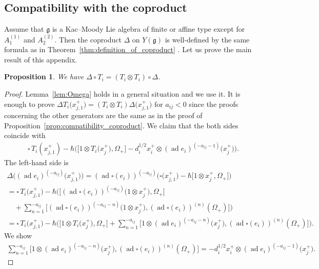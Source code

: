 \documentclass[10pt,a4paper]{amsart}
\newtheorem{prop}[thm]{Proposition}
\theoremstyle{definition}
\numberwithin{equation}{section}
\DeclareMathOperator{\ad}{ad}
\newcommand{\frakg}{\mathfrak{g}}
\begin{document}
\subsection{Compatibility with the coproduct}

Assume that $\frakg$ is a Kac--Moody Lie algebra of finite or affine type except for $A_1^{(1)}$ and $A_2^{(2)}$. Then the coproduct $\Delta$ on $Y(\frakg)$ is well-defined by the same formula as in Theorem~\ref{thm:definition_of_coproduct} \cite[Definition~4.6, Theorem~4.9, Proposition~5.18]{MR3861718}. Let us prove the main result of this appendix.
\begin{prop}\label{prop:compatibility_coproduct2} We have $\Delta \circ T_i = (T_i \otimes T_i) \circ \Delta$.
\end{prop}
\begin{proof}Lemma~\ref{lem:Omega} holds in a general situation and we use it. It is enough to prove $\Delta T_i\big(x_{j,1}^+\big) = (T_i \otimes T_i)\Delta\big(x_{j,1}^+\big)$ for $a_{ij} < 0$ since the proofs concerning the other generators are the same as in the proof of Proposition~\ref{prop:compatibility_coproduct}. We claim that the both sides coincide with
\begin{gather*}
\square\,T_i(x_{j,1}^+)-\hbar \big( \big[1 \otimes T_i\big(x_j^+\big),\Omega_+\big] - d_i^{1/2}x_i^+ \otimes (\ad e_i)^{(-a_{ij}-1)}\big(x_j^+\big) \big).
\end{gather*}
The left-hand side is
\begin{gather*}
\Delta \big( (\ad e_i)^{(-a_{ij})} \big(x_{j,1}^+\big)\big) = (\ad \square(e_i))^{(-a_{ij})} \big(\square\big(x_{j,1}^+\big) - \hbar\big[1 \otimes x_j^+,\Omega_+\big]\big) \\
= \square\,T_i\big(x_{j,1}^+\big) - \hbar\bigg( \big[(\ad \square(e_i))^{(-a_{ij})}\big(1 \otimes x_j^+\big),\Omega_+\big] \\
\quad{} + \sum_{n=1}^{-a_{ij}} \big[(\ad \square(e_i))^{(-a_{ij}-n)}\big(1 \otimes x_j^+\big),(\ad \square(e_i))^{(n)}(\Omega_+)\big]\bigg) \\
= \square\,T_i\big(x_{j,1}^+\big) - \hbar\bigg( \big[1 \otimes T_i\big(x_j^+\big),\Omega_+\big] + \sum_{n=1}^{-a_{ij}} \big[1 \otimes (\ad e_i)^{(-a_{ij}-n)}\big(x_j^+\big),(\ad \square(e_i))^{(n)}(\Omega_+)\big]\bigg).
\end{gather*}
We show
\begin{gather*}
\sum_{n=1}^{-a_{ij}} \big[1 \otimes (\ad e_i)^{(-a_{ij}-n)}\big(x_j^+\big),(\ad \square(e_i))^{(n)}(\Omega_+)\big] = - d_i^{1/2} x_i^+ \otimes (\ad e_i)^{(-a_{ij}-1)}\big(x_j^+\big).

\end{gather*}
\end{proof}
\end{document}
